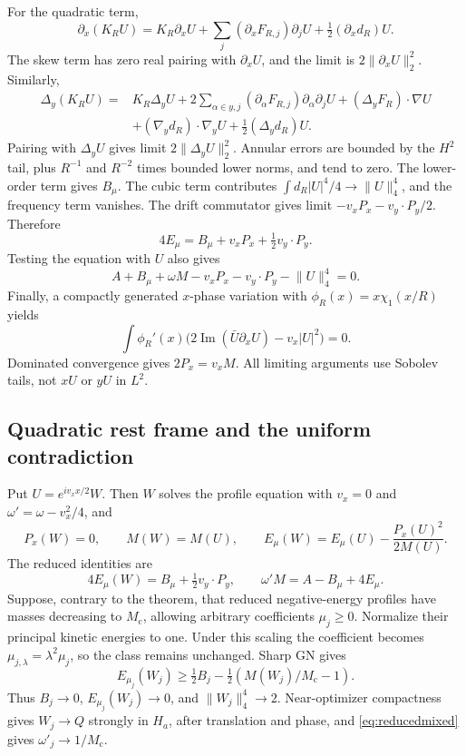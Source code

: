 \documentclass[11pt]{article}
\theoremstyle{definition}
\theoremstyle{remark}
\DeclareMathOperator{\Ima}{Im}
\newcommand{\norm}[1]{\lVert #1\rVert}
\newcommand{\mc}{M_{\mathrm c}}
\begin{document}
For the quadratic term,
\[
 \partial_x(K_RU)=K_R\partial_xU+
 \sum_j(\partial_xF_{R,j})\partial_jU+\tfrac12(\partial_xd_R)U.
\]
The skew term has zero real pairing with $\partial_xU$, and the limit is $2\norm{\partial_xU}_2^2$. Similarly,
\begin{align*}
 \Delta_y(K_RU)={}&K_R\Delta_yU
 +2\sum_{\alpha\in y,j}(\partial_\alpha F_{R,j})
                         \partial_\alpha\partial_jU
 +(\Delta_yF_R)\cdot\nabla U\\
 &+(\nabla_yd_R)\cdot\nabla_yU+\tfrac12(\Delta_yd_R)U.
\end{align*}
Pairing with $\Delta_yU$ gives limit $2\norm{\Delta_yU}_2^2$. Annular errors are bounded by the $H^2$ tail, plus $R^{-1}$ and $R^{-2}$ times bounded lower norms, and tend to zero. The lower-order term gives $B_\mu$. The cubic term contributes $\int d_R|U|^4/4\to\norm U_4^4$, and the frequency term vanishes. The drift commutator gives limit $-v_xP_x-v_y\cdot P_y/2$. Therefore
\begin{equation}\label{eq:mixedpohoz}
 4E_\mu=B_\mu+v_xP_x+\tfrac12v_y\cdot P_y.
\end{equation}
Testing the equation with $U$ also gives
\begin{equation}\label{eq:mixednehari}
 A+B_\mu+\omega M-v_xP_x-v_y\cdot P_y-\norm U_4^4=0.
\end{equation}
Finally, a compactly generated $x$-phase variation with $\phi_R(x)=x\chi_1(x/R)$ yields
\[
 \int\phi_R'(x)\bigl(2\Ima(\bar U\partial_xU)-v_x|U|^2\bigr)=0.
\]
Dominated convergence gives $2P_x=v_xM$. All limiting arguments use Sobolev tails, not $xU$ or $yU$ in $L^2$.

\subsection{Quadratic rest frame and the uniform contradiction}

Put $U=e^{iv_xx/2}W$. Then $W$ solves the profile equation with $v_x=0$ and $\omega'=\omega-v_x^2/4$, and
\[
 P_x(W)=0,\qquad M(W)=M(U),\qquad
 E_\mu(W)=E_\mu(U)-\frac{P_x(U)^2}{2M(U)}.
\]
The reduced identities are
\begin{equation}\label{eq:reducedmixed}
 4E_\mu(W)=B_\mu+\tfrac12v_y\cdot P_y,
 \qquad \omega'M=A-B_\mu+4E_\mu.
\end{equation}
Suppose, contrary to the theorem, that reduced negative-energy profiles have masses decreasing to $\mc$, allowing arbitrary coefficients $\mu_j\ge0$. Normalize their principal kinetic energies to one. Under this scaling the coefficient becomes $\mu_{j,\lambda}=\lambda^2\mu_j$, so the class remains unchanged. Sharp GN gives
\[
 E_{\mu_j}(W_j)\ge\tfrac12B_j
                      -\tfrac12(M(W_j)/\mc-1).
\]
Thus $B_j\to0$, $E_{\mu_j}(W_j)\to0$, and $\norm{W_j}_4^4\to2$. Near-optimizer compactness gives $W_j\to Q$ strongly in $H_a$, after translation and phase, and \eqref{eq:reducedmixed} gives $\omega'_j\to1/\mc$.
\end{document}
